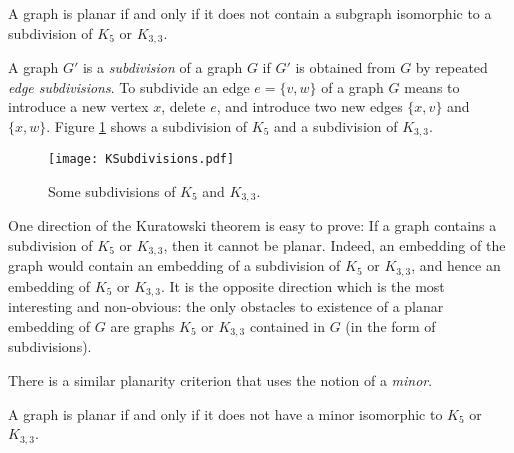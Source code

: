 \begin{page}
\setcounter{section}{3}
\setcounter{subsection}{3}
\setcounter{dfn}{10}
\label{portion:352}

\begin{thm}[Kuratowski]
A graph is planar if and only if it does not contain a subgraph isomorphic to a subdivision of $K_5$ or $K_{3,3}$.
\end{thm}

\end{page}

\begin{page}
\setcounter{section}{3}
\setcounter{subsection}{3}
\setcounter{dfn}{10}
\label{portion:353}


A graph $G'$ is a \emph{subdivision} of a graph $G$ if $G'$ is obtained from $G$ by repeated \emph{edge subdivisions}.
To subdivide an edge $e = \{v,w\}$ of a graph $G$ means to introduce a new vertex $x$, delete $e$, and introduce two new edges $\{x,v\}$ and $\{x,w\}$.
Figure \ref{fig:KSubdivisions} shows a subdivision of $K_5$ and a subdivision of $K_{3,3}$.

\begin{figure}[ht]
\begin{center}
\texttt{[image: KSubdivisions.pdf]}
\end{center}
\caption{Some subdivisions of $K_5$ and $K_{3,3}$.}
\label{fig:KSubdivisions}
\end{figure}

One direction of the Kuratowski theorem is easy to prove: If a graph contains a subdivision of $K_5$ or $K_{3,3}$, then it cannot be planar.
Indeed, an embedding of the graph would contain an embedding of a subdivision of $K_5$ or $K_{3,3}$,
and hence an embedding of $K_5$ or $K_{3,3}$.
It is the opposite direction which is the most interesting and non-obvious:
the only obstacles to existence of a planar embedding of $G$ are graphs $K_5$ or $K_{3,3}$ contained in $G$ (in the form of subdivisions).


There is a similar planarity criterion that uses the notion of a \emph{minor}.


\end{page}

\begin{page}
\setcounter{section}{3}
\setcounter{subsection}{3}
\setcounter{dfn}{11}
\label{portion:355}

\begin{thm}[Wagner]
A graph is planar if and only if it does not have a minor isomorphic to $K_5$ or $K_{3,3}$.
\end{thm}

\end{page}

